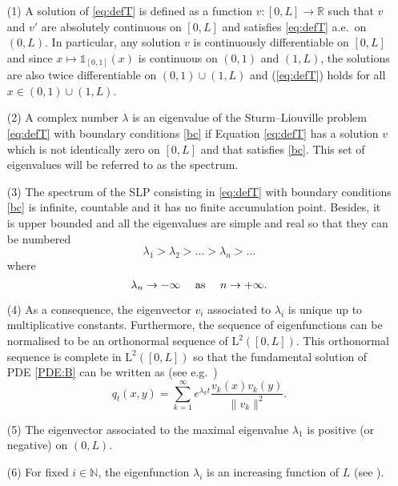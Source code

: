 \documentclass[11pt]{article}
\theoremstyle{plain}
\begin{document}
\begin{itemize}
\item[(1)] A solution of \eqref{eq:defT} is defined as a function $v:[0,L]\to \mathbb{R}$ such that $v$ and $v'$ are absolutely continuous on $[0,L]$ and satisfies \eqref{eq:defT} a.e.~on $(0,L)$. In particular, any solution $v$ is continuously differentiable on $[0,L]$ and since $x\mapsto\mathbb{1}_{[0,1]}(x)$ is continuous on $(0,1)$ and $(1,L)$, the solutions are also twice differentiable on $(0,1)\cup(1,L)$ and (\ref{eq:defT}) holds for all $x\in(0,1)\cup(1,L)$. 
\item[(2)] A complex number $\lambda$ is an eigenvalue of the Sturm--Liouville problem \eqref{eq:defT} with boundary conditions \eqref{bc}  if Equation \eqref{eq:defT} has a solution $v$ which is not identically zero on $[0,L]$ and that satisfies \eqref{bc}. This set of eigenvalues will be referred to as the spectrum.
\item[(3)] The spectrum of the SLP consisting in \eqref{eq:defT} with boundary conditions \eqref{bc} is infinite, countable and it has no finite accumulation point. Besides, it is upper bounded and all the eigenvalues are simple and real so that they can be numbered 
\begin{equation*}
\lambda_1>\lambda_2>...> \lambda_n>... 
\end{equation*}
where 
\begin{equation*}
\lambda_n\rightarrow -\infty \quad \textnormal{ as } \quad  n\rightarrow+\infty.
\end{equation*}
\item[(4)] As a consequence, the eigenvector $v_i$ associated to $\lambda_i$ is unique up to multiplicative constants. Furthermore, the sequence of eigenfunctions can be normalised to be an orthonormal sequence of $\mathrm{L}^2([0,L])$. This orthonormal sequence is complete in $\mathrm{L}^2([0,L])$ so that the fundamental solution of PDE \eqref{PDE:B} can be written as (see e.g.~\cite[p.188]{Lawler:2018vn}) 
\begin{equation}
q_t(x,y)=\sum_{k=1}^\infty e^{\lambda_k t}\frac{v_k(x)v_k(y)}{\|v_k\|^2}.\label{def:qt1}
\end{equation}
\item[(5)] The eigenvector associated to the maximal eigenvalue $\lambda_1$ is positive (or negative) on $(0,L)$.
\item[(6)] For fixed $i\in\mathbb{N}$, the eigenfunction $\lambda_i$ is an increasing function of $L$ (see \cite[Theorem 4.4.4]{Zettl:2010aa}).
\end{itemize}
\end{document}

